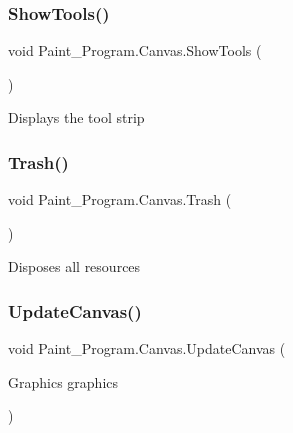 \subsubsection{\texorpdfstring{Show\+Tools()}{ShowTools()}}
{\footnotesize\ttfamily void Paint\+\_\+\+Program.\+Canvas.\+Show\+Tools (\begin{DoxyParamCaption}{ }\end{DoxyParamCaption})\hspace{0.3cm}{\ttfamily [inline]}}



Displays the tool strip 

\mbox{\label{class_paint___program_1_1_canvas_ac7d12ff2474d5bca00d8d399f0f6f17f}} 
\subsubsection{\texorpdfstring{Trash()}{Trash()}}
{\footnotesize\ttfamily void Paint\+\_\+\+Program.\+Canvas.\+Trash (\begin{DoxyParamCaption}{ }\end{DoxyParamCaption})\hspace{0.3cm}{\ttfamily [inline]}}



Disposes all resources 

\mbox{\label{class_paint___program_1_1_canvas_addf9e6c4759c930a9aaba20125f66a24}} 
\subsubsection{\texorpdfstring{Update\+Canvas()}{UpdateCanvas()}}
{\footnotesize\ttfamily void Paint\+\_\+\+Program.\+Canvas.\+Update\+Canvas (\begin{DoxyParamCaption}\item[{Graphics}]{graphics }\end{DoxyParamCaption})\hspace{0.3cm}{\ttfamily [inline]}}



